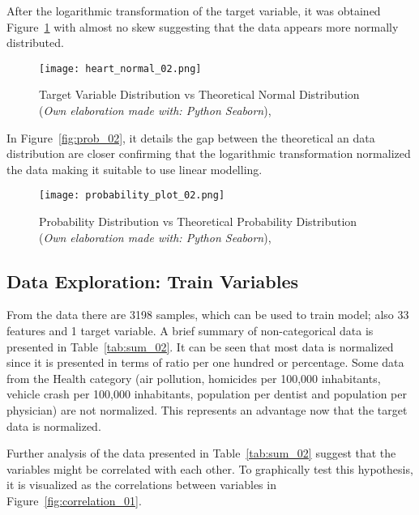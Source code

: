 \documentclass[
10pt, %
a4paper, %
oneside, %
headinclude,footinclude, %
BCOR5mm, %
]{scrartcl}
\begin{document}
After the logarithmic transformation of the target variable, it was obtained Figure~\ref{fig:target_02} with almost no skew suggesting that the data appears more normally distributed.

\FloatBarrier
\begin{figure}[H]
\centering 
\texttt{[image: heart\_normal\_02.png]} 
\caption[Target Variable Normalized]{Target Variable Distribution vs Theoretical Normal Distribution (\emph{Own elaboration made with: Python Seaborn}), }
\label{fig:target_02} 
\end{figure}

In Figure~\vref{fig:prob_02}, it details the gap between the theoretical an data distribution are closer confirming that the logarithmic transformation normalized the data making it suitable to use linear modelling.

\FloatBarrier
\begin{figure}[H]
\centering 
\texttt{[image: probability\_plot\_02.png]} 
\caption[Q-Q Graph Normalized]{Probability Distribution vs Theoretical Probability Distribution (\emph{Own elaboration made with: Python Seaborn}), }
\label{fig:prob_02} 
\end{figure}

\subsection{Data Exploration: Train Variables}

From the data there are 3198 samples, which can be used to train model; also 33 features and 1 target variable. A brief summary of non-categorical data is presented in Table~\ref{tab:sum_02}. It can be seen that most data is normalized since it is presented in terms of ratio per one hundred or percentage. Some data from the Health category (air pollution, homicides per 100,000 inhabitants, vehicle crash per 100,000 inhabitants, population per dentist and population per physician) are not normalized. This represents an advantage now that the target data is normalized.



Further analysis of the data presented in Table~\ref{tab:sum_02} suggest that the variables might be correlated with each other. To graphically test this hypothesis, it is visualized as the correlations between variables in Figure~\ref{fig:correlation_01}.
 
\end{document}
